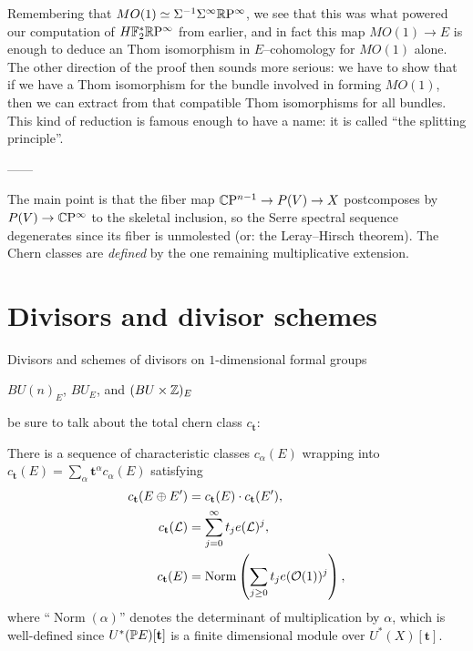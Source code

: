 Remembering that $MO(1) \simeq \Susp^{-1} \Susp^\infty \RP^\infty$, we see that this was what powered our computation of $H\F_2^* \RP^\infty$ from earlier, and in fact this map $MO(1) \to E$ is enough to deduce an Thom isomorphism in $E$--cohomology for $MO(1)$ alone.  The other direction of the proof then sounds more serious: we have to show that if we have a Thom isomorphism for the bundle involved in forming $MO(1)$, then we can extract from that compatible Thom isomorphisms for all bundles.  This kind of reduction is famous enough to have a name: it is called ``the splitting principle''.


------

The main point is that the fiber map $\CP^{n-1} \to P(V) \to X$ postcomposes by $P(V) \to \CP^\infty$ to the skeletal inclusion, so the Serre spectral sequence degenerates since its fiber is unmolested (or: the Leray--Hirsch theorem). The Chern classes are \emph{defined} by the one remaining multiplicative extension.





\section{Divisors and divisor schemes}

Divisors and schemes of divisors on $1$-dimensional formal groups

$BU(n)_E$, $BU_E$, and $(BU \times \Z)_E$

be sure to talk about the total chern class $c_{\mathbf t}$:
\begin{definition}
There is a sequence of characteristic classes $c_\alpha(E)$ wrapping into $c_{\mathbf t}(E) = \sum_{\alpha} \mathbf t^\alpha c_\alpha(E)$ satisfying
\begin{align*}
c_{\mathbf t}(E \oplus E') & = c_{\mathbf t}(E) \cdot c_{\mathbf t}(E'), \\
c_{\mathbf t}(\L) & = \sum_{j=0}^\infty t_j e(\L)^j, \\
c_{\mathbf t}(E) & = \operatorname{Norm}\left( \sum_{j \ge 0} t_j e(\mathcal O(1))^j \right),
\end{align*}
where ``$\operatorname{Norm}(\alpha)$'' denotes the determinant of multiplication by $\alpha$, which is well-defined since $U^*(\P E)[\mathbf t]$ is a finite dimensional module over $U^*(X)[\mathbf t]$.
\end{definition}









